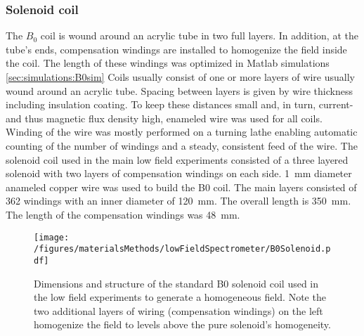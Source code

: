         \subsubsection{Solenoid coil}
            The $B_0$ coil is wound around an acrylic tube in two full layers. In addition, at the
            tube's ends, compensation windings are installed to homogenize the field inside the coil.
            The length of these windings was optimized in Matlab simulations \ref{sec:simulations:B0sim}
            Coils usually consist of one or more layers of wire usually wound around an acrylic tube. Spacing between layers is given by wire thickness including insulation coating. To keep  these distances small and, in turn, current- and thus magnetic flux density high, enameled wire was used for all coils. Winding of the wire was mostly performed on a turning lathe enabling automatic counting of the number of windings and a steady, consistent feed of the wire.
            The solenoid coil used in the main low field experiments consisted of a three layered solenoid with two layers of compensation windings on each side. \SI{1}{\mm} diameter anameled copper wire was used to build the B0 coil. The main layers consisted of 362 windings with an inner diameter of \SI{120}{\mm}. The overall length is \SI{350}{\milli\meter}. The length of the compensation windings was \SI{48}{\mm}.
            \begin{figure}
                \centering
                \texttt{[image: /figures/materialsMethods/lowFieldSpectrometer/B0Solenoid.pdf]}
                \caption[B0 coil layout]{Dimensions and structure of the standard B0 solenoid coil used in the low field experiments to generate a homogeneous field. Note the two additional layers of wiring (compensation windings) on the left homogenize the field to levels above the pure solenoid's homogeneity.}
                \label{fig:matMeth:b0Solenoid}
            \end{figure}
